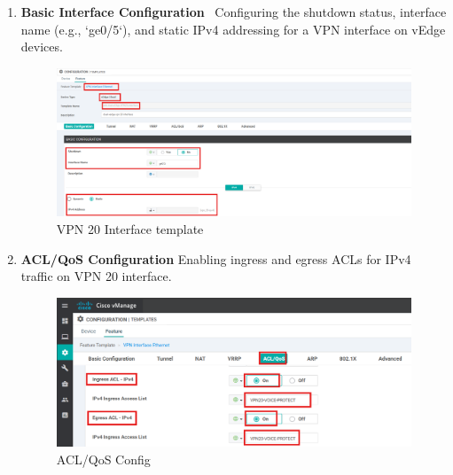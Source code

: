 \documentclass[12pt,english]{report}
\begin{document}
\begin{enumerate}
    \item \textbf{Basic Interface Configuration} \
    Configuring the shutdown status, interface name (e.g., `ge0/5`), and static IPv4 addressing for a VPN interface on vEdge devices.
\begin{figure}[H]
    \centering
    \includegraphics[width= 1 \textwidth]{chapitre 3/template/15.png}
    \caption{VPN 20 Interface template}
    \label{VPN 20 Interface template}
\end{figure}    
    \item \textbf{ACL/QoS Configuration}
    Enabling ingress and egress ACLs for IPv4 traffic on VPN 20 interface.
\begin{figure}[H]
    \centering
    \includegraphics[width= 1 \textwidth]{chapitre 3/vpn20-acl-config.png}
    \caption{ACL/QoS Config}
    \label{ACL/QoS Config}
\end{figure}
\end{enumerate}
\end{document}
